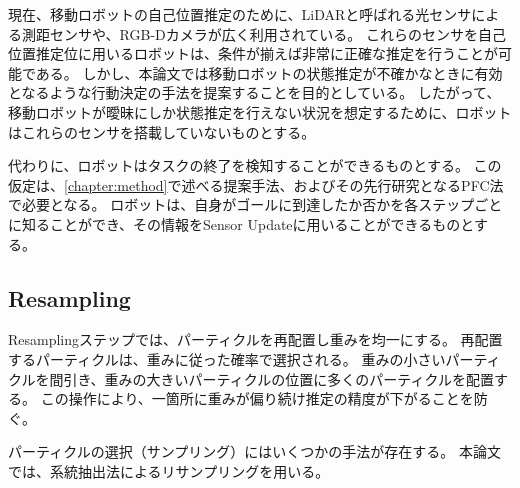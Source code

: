 現在、移動ロボットの自己位置推定のために、LiDARと呼ばれる光センサによる測距センサや、RGB-Dカメラが広く利用されている。
これらのセンサを自己位置推定位に用いるロボットは、条件が揃えば非常に正確な推定を行うことが可能である。
しかし、本論文では移動ロボットの状態推定が不確かなときに有効となるような行動決定の手法を提案することを目的としている。
したがって、移動ロボットが曖昧にしか状態推定を行えない状況を想定するために、ロボットはこれらのセンサを搭載していないものとする。

代わりに、ロボットはタスクの終了を検知することができるものとする。
この仮定は、\ref{chapter:method}で述べる提案手法、およびその先行研究となるPFC法で必要となる。
ロボットは、自身がゴールに到達したか否かを各ステップごとに知ることができ、その情報をSensor Updateに用いることができるものとする。

\subsection{Resampling}
Resamplingステップでは、パーティクルを再配置し重みを均一にする。
再配置するパーティクルは、重みに従った確率で選択される。
重みの小さいパーティクルを間引き、重みの大きいパーティクルの位置に多くのパーティクルを配置する。
この操作により、一箇所に重みが偏り続け推定の精度が下がることを防ぐ。

パーティクルの選択（サンプリング）にはいくつかの手法が存在する。
本論文では、系統抽出法によるリサンプリングを用いる。
